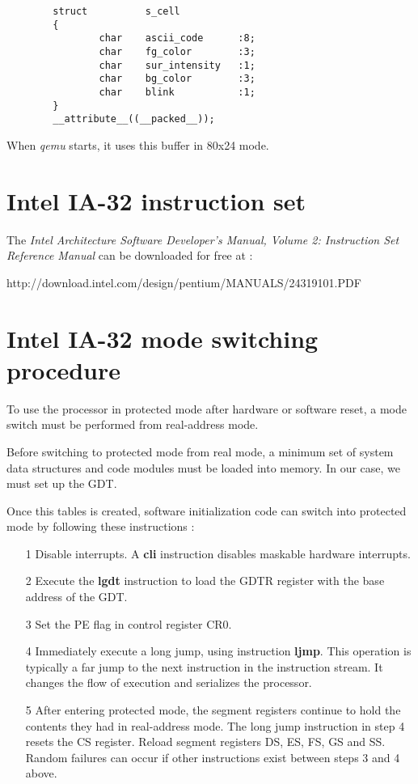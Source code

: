 \begin{verbatim}
        struct          s_cell
        {
                char    ascii_code      :8;
                char    fg_color        :3;
                char    sur_intensity   :1;
                char    bg_color        :3;
                char    blink           :1;
        }
        __attribute__((__packed__));
\end{verbatim}

When \emph{qemu} starts, it uses this buffer in 80x24 mode.

%
%

\newpage
\section{Intel IA-32 instruction set}

The  \emph{Intel Architecture Software Developer's Manual, Volume 2:
Instruction Set Reference Manual} can be downloaded for free at :

http://download.intel.com/design/pentium/MANUALS/24319101.PDF

\section{Intel IA-32 mode switching procedure}

To use the processor in protected mode after hardware or software reset, a mode
switch must be performed from real-address mode.

Before switching to protected mode from real mode, a minimum set of system data
structures and code modules must be loaded into memory. In our case, we must
set up the GDT.

Once this tables is created, software initialization code can switch into
protected mode by following these instructions :
\begin{itemize}
  \item[1] Disable interrupts. A \textbf{cli} instruction disables maskable
    hardware interrupts.
  \item[2] Execute the \textbf{lgdt} instruction to load the GDTR register
    with the base address of the GDT.
  \item[3] Set the PE flag in control register CR0.
  \item[4] Immediately execute a long jump, using instruction \textbf{ljmp}.
    This operation is typically a far jump to the next instruction in the
    instruction stream. It changes the flow of execution and serializes the
    processor.
  \item[5] After entering protected mode, the segment registers continue to
    hold the contents they had in real-address mode. The long jump instruction
    in step 4 resets the CS register. Reload segment registers DS, ES, FS, GS
    and SS. Random failures can occur if other instructions exist between
    steps 3 and 4 above.
\end{itemize}

